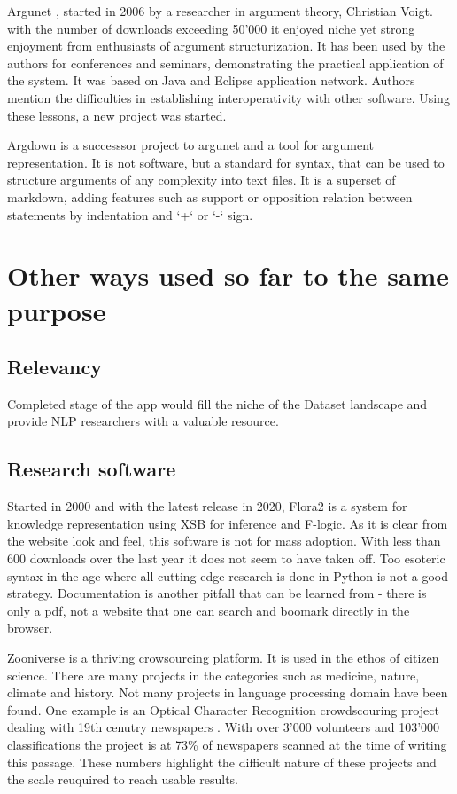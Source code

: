 \documentclass{report}
\begin{document}
Argunet \cite{noauthor_argunet_2018}, started in 2006 by a researcher in argument theory, Christian Voigt. with the number of downloads exceeding 50'000 it enjoyed niche yet strong enjoyment from enthusiasts of argument structurization. It has been used by the authors for conferences and seminars, demonstrating the practical application of the system. It was based on Java and Eclipse application network. Authors mention the difficulties in establishing interoperativity with other software. Using these lessons, a new project was started.

Argdown \cite{noauthor_argdown_nodate} is a successsor project to argunet and a tool for argument representation. It is not software, but a standard for syntax, that can be used to structure arguments of any complexity into text files. It is a superset of markdown, adding features such as support or opposition relation between statements by indentation and `+` or `-` sign.

\section{Other ways used so far to the same purpose}

\subsection{Relevancy}
Completed stage of the app would fill the niche of the Dataset landscape and provide NLP researchers with a valuable resource.

\subsection{Research software}

Started in 2000 and with the latest release in 2020,
Flora2 \cite{noauthor_flora-2_nodate} is a system for knowledge representation using XSB for inference and F-logic.
As it is clear from the website look and feel, this software is not for mass adoption.
With less than 600 downloads over the last year \cite{noauthor_flora-2_nodate-4} it does not seem to have taken off.
Too esoteric syntax in the age where all cutting edge research is done in Python is not a good strategy. Documentation is another pitfall that can be learned from - there is only a pdf, not a website that one can search and boomark directly in the browser. 

Zooniverse \cite{noauthor_zooniverse_nodate} is a thriving crowsourcing platform. It is used in the ethos of citizen science. There are many projects in the categories such as medicine, nature, climate and history.  Not many projects in language processing domain have been found. One example is an Optical Character Recognition crowdscouring project dealing with 19th cenutry newspapers \cite{noauthor_zooniverse_nodate-1}. With over 3'000 volunteers and 103'000 classifications the project is at 73\% of newspapers scanned at the time of writing this passage.
These numbers highlight the difficult nature of these projects and the scale reuquired to reach usable results.
\end{document}
